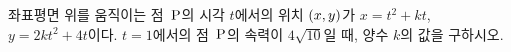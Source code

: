 좌표평면 위를 움직이는 점~$\mathrm{P}$의 시각 $t$에서의 위치 $(x{,}\mkern3mu\mathopen{}y)$가 $x=t^2+kt$, $y=2kt^2+4t$이다. $t=1$에서의 점~$\mathrm{P}$의 속력이 $4\sqrt{10}$일 때, 양수 $k$의 값을 구하시오.
